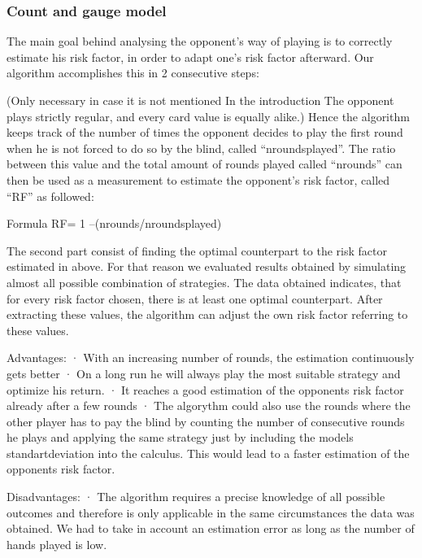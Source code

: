 \documentclass[11pt]{article}
\begin{document}
\subsubsection{Count and gauge model}

The main goal behind analysing the opponent’s way of playing is to correctly estimate his risk factor, in order to adapt one’s risk factor afterward. 
Our algorithm accomplishes this in 2 consecutive steps:
 
(Only necessary in case it is not mentioned In the introduction The opponent plays strictly regular, and every card value is equally alike.) Hence the algorithm keeps track of the number of times the opponent decides to play the first round when he is not forced to do so by the blind, called “nroundsplayed”. The ratio between this value and the total amount of rounds played called “nrounds” can then be used as a measurement to estimate the opponent’s risk factor, called “RF” as followed:
 
Formula RF= 1 –(nrounds/nroundsplayed)
 
The second part consist of finding the optimal counterpart to the risk factor estimated in above. For that reason we evaluated results obtained by simulating almost all possible combination of strategies. The data obtained indicates, that for every risk factor chosen, there is at least one optimal counterpart. After extracting these values, the algorithm can adjust the own risk factor referring to these values.
 
Advantages:
·         With an increasing number of rounds, the estimation continuously gets better
·          On a long run he will always play the most suitable strategy and optimize his return.
·         It reaches a good estimation of the opponents risk factor already after a few rounds
·         The algorythm could also use the rounds where the other player has to pay the blind by counting the number of consecutive rounds he plays and applying the same strategy just by including the models standartdeviation into the calculus. This would lead to a faster estimation of the opponents risk factor.
 
Disadvantages:
·         The algorithm requires a precise knowledge of all possible outcomes and therefore is only applicable in the same circumstances the data was obtained.
We had to take in account an estimation error as long as the number of hands played is low.

 

 
\end{document}
